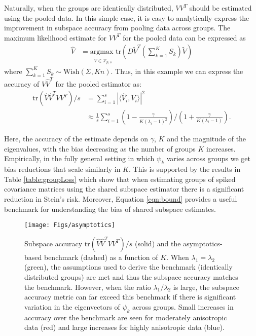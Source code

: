 \documentclass[12pt]{article}
\newcommand{\tr}{\text{tr}}
\begin{document}
Naturally, when the groups are identically distributed, $VV^T$ should
be estimated using the pooled data.  In this simple case, it is easy
to analytically express the improvement in subspace accuracy from
pooling data across groups.  The maximum likelihood estimate for
$VV^T$ for the pooled data can be expressed as
\begin{align*}
\hat{V} &= \underset{\widetilde{V} \in \mathcal{V}_{p,
    s}}{\text{argmax }} \tr\left(D\widetilde{V}^T
  (\sum_{k=1}^K S_k)\widetilde{V}\right)
\end{align*}
%
\noindent where $\sum_{k=1}^K S_k \sim \text{Wish}(\Sigma, Kn)$.
Thus, in this example we can express the accuracy of
$\hat{V}\hat{V}^T$ for the pooled estimator as:
%
\begin{align}
\nonumber \tr(\hat{V}\hat{V}^TVV^T)/s &= \sum_{i=1}^s |\langle\hat{V}_i, V_i\rangle|^2\\
&\approx\frac{1}{s}\sum_{i=1}^s  \left(1-\frac{\gamma}{K(\lambda_i - 1)^2}\right) /\left(1 +
    \frac{\gamma}{K(\lambda_i - 1)}\right).
\label{eqn:bound}
\end{align}

Here, the accuracy of the estimate depends on $\gamma$, $K$ and the
magnitude of the eigenvalues, with the bias decreasing as the number
of groups $K$ increases.  Empirically, in the fully general setting in
which $\psi_k$ varies across groups we get bias reductions that scale
similarly in $K$.  This is supported by the results in Table
\ref{table:groupLoss} which show that when estimating groups of spiked
covariance matrices using the shared subspace estimator there is a
significant reduction in Stein's risk. Moreover, Equation
\ref{eqn:bound} provides a useful benchmark for understanding the
bias of shared subspace estimates.

\begin{figure}[t]
    \centering
    \texttt{[image: Figs/asymptotics]}
    \caption{Subspace accuracy $\tr(\hat{V}\hat{V}^TVV^T)/s$ (solid)
      and the asymptotics-based benchmark (dashed)
      as a function of $K$.  When
      $\lambda_1=\lambda_2$ (green), the assumptions used to derive
      the benchmark (identically distributed groups) are met and thus the
      subspace accuracy matches the benchmark.  However, when the
      ratio $\lambda_1/\lambda_2$ is large, the subspace accuracy
      metric can far exceed this benchmark if there is significant
      variation in the eigenvectors of $\psi_k$ across groups.  Small
      increases in accuracy over the benchmark are seen for moderately
      anisotropic data (red) and large increases for highly
      anisotropic data (blue).  }
      \label{fig:asymptotics}
\end{figure}
\end{document}

